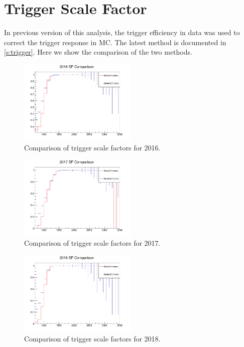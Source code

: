 \section{Trigger Scale Factor}
In previous version of this analysis, the trigger efficiency in data was used to correct the trigger response in MC. The latest method is documented in \ref{s:trigger}. Here we show the comparison of the two methods.
\begin{figure}[!htb]
	\centering
	\includegraphics[width=0.5\textwidth]{Figures/triggerMethodComparisonstudy2016.png}
	\caption{Comparison of trigger scale factors for 2016.}
	\label{fig:triggerStudy16}
\end{figure}
\begin{figure}[!htb]
	\centering
	\includegraphics[width=0.5\textwidth]{Figures/triggerMethodComparisonstudy2017.png}
	\caption{Comparison of trigger scale factors for 2017.}
	\label{fig:triggerStudy17}
\end{figure}
\begin{figure}[!htb]
	\centering
	\includegraphics[width=0.5\textwidth]{Figures/triggerMethodComparisonstudy2018.png}
	\caption{Comparison of trigger scale factors for 2018.}
	\label{fig:triggerStudy18}
\end{figure}
\clearpage
